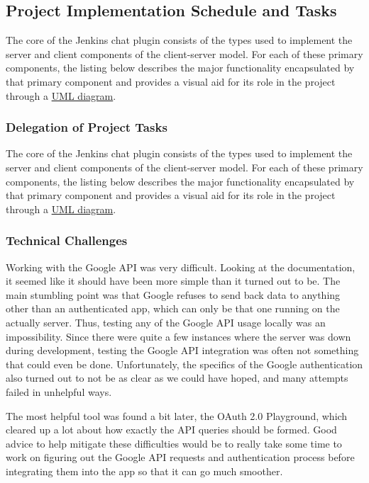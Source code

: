 \documentclass{article}
\begin{document}
		\subsection[Implementation Schedule]{Project Implementation Schedule and Tasks}
		The core of the Jenkins chat plugin consists of the types used to
		implement the server and client components of the client-server model.
		For each of these primary components, the listing below describes the
		major functionality encapsulated by that primary component and provides
		a visual aid for its role in the project through a 
		\href{http://www.csci.csusb.edu/dick/samples/uml0.html}{UML diagram}.

			\subsubsection[Task Delegation]{Delegation of Project Tasks}
			The core of the Jenkins chat plugin consists of the types used to
			implement the server and client components of the client-server model.
			For each of these primary components, the listing below describes the
			major functionality encapsulated by that primary component and provides
			a visual aid for its role in the project through a 
			\href{http://www.csci.csusb.edu/dick/samples/uml0.html}{UML diagram}.

			\subsubsection[Technical Challenges]{Technical Challenges}
			Working with the Google API was very difficult.
			Looking at the documentation, it seemed like it should have been more simple
			than it turned out to be. The main stumbling point was that Google refuses to
			send back data to anything other than an authenticated app, which can only be
			that one running on the actually server. Thus, testing any of the Google API
			usage locally was an impossibility. Since there were quite a few instances
			where the server was down during development, testing the Google API integration
			was often not something that could even be done. Unfortunately, the specifics
			of the Google authentication also turned out to not be as clear as we could
			have hoped, and many attempts failed in unhelpful ways.

			The most helpful tool
			was found a bit later, the OAuth 2.0 Playground, which cleared up a lot about
			how exactly the API queries should be formed. Good advice to help mitigate
			these difficulties would be to really take some time to work on figuring
			out the Google API requests and authentication process before integrating
			them into the app so that it can go much smoother.
\end{document}
